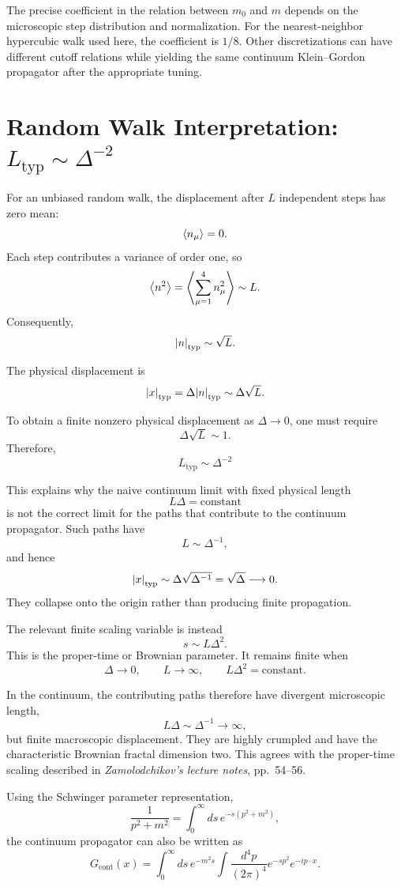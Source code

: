\documentclass[11pt]{article}
\begin{document}
	The precise coefficient in the relation between $m_0$ and $m$ depends
	on the microscopic step distribution and normalization. For the
	nearest-neighbor hypercubic walk used here, the coefficient is
	$1/8$. Other discretizations can have different cutoff relations while
	yielding the same continuum Klein--Gordon propagator after the
	appropriate tuning.
	
	\section{Random Walk Interpretation: \texorpdfstring{$L_{\mathrm{typ}}\sim\Delta^{-2}$}{Ltyp approximately Delta inverse squared}}
	
	For an unbiased random walk, the displacement after $L$ independent
	steps has zero mean:
	\[
	\expval{n_\mu}=0.
	\]
	Each step contributes a variance of order one, so
	\[
	\expval{n^2}
	=
	\expval{\sum_{\mu=1}^{4}n_\mu^2}
	\sim L.
	\]
	Consequently,
	\[
	\abs{n}_{\mathrm{typ}}\sim\sqrt{L}.
	\]
	
	The physical displacement is
	\[
	\abs{x}_{\mathrm{typ}}
	=
	\Delta\abs{n}_{\mathrm{typ}}
	\sim
	\Delta\sqrt{L}.
	\]
	
	To obtain a finite nonzero physical displacement as $\Delta\to0$, one
	must require
	\[
	\Delta\sqrt{L}\sim1.
	\]
	Therefore,
	\[
	\boxed{
		L_{\mathrm{typ}}\sim\Delta^{-2}
	}
	\]
	
	This explains why the naive continuum limit with fixed physical
	length
	\[
	L\Delta=\text{constant}
	\]
	is not the correct limit for the paths that contribute to the
	continuum propagator. Such paths have
	\[
	L\sim\Delta^{-1},
	\]
	and hence
	\[
	\abs{x}_{\mathrm{typ}}
	\sim
	\Delta\sqrt{\Delta^{-1}}
	=
	\sqrt{\Delta}
	\longrightarrow0.
	\]
	They collapse onto the origin rather than producing finite propagation.
	
	The relevant finite scaling variable is instead
	\[
	s\sim L\Delta^2.
	\]
	This is the proper-time or Brownian parameter. It remains finite when
	\[
	\Delta\to0,
	\qquad
	L\to\infty,
	\qquad
	L\Delta^2=\text{constant}.
	\]
	
	In the continuum, the contributing paths therefore have divergent
	microscopic length,
	\[
	L\Delta\sim\Delta^{-1}\longrightarrow\infty,
	\]
	but finite macroscopic displacement. They are highly crumpled and have
	the characteristic Brownian fractal dimension two. This agrees with
	the proper-time scaling described in
	\emph{Zamolodchikov’s lecture notes}, pp.~54--56.
	
	Using the Schwinger parameter representation,
	\[
	\frac{1}{p^2+m^2}
	=
	\int_0^\infty ds\,
	e^{-s(p^2+m^2)},
	\]
	the continuum propagator can also be written as
	\[
	G_{\mathrm{cont}}(x)
	=
	\int_0^\infty ds\,e^{-m^2s}
	\int\frac{d^4p}{(2\pi)^4}
	e^{-sp^2}e^{-ip\cdot x}.
	\]
	
\end{document}

